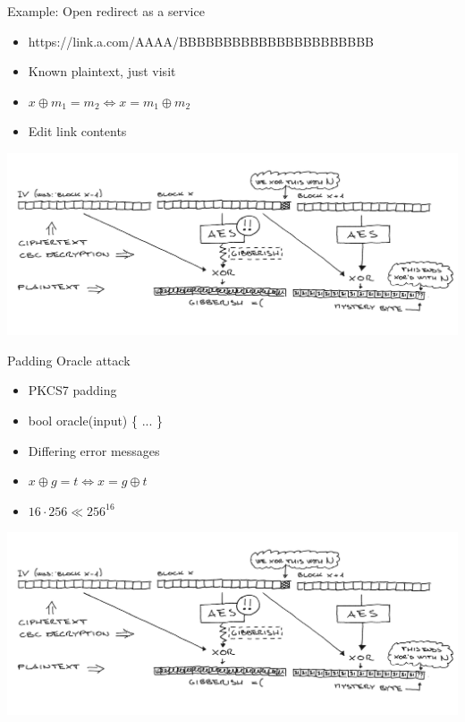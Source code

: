 \documentclass[10pt, compress]{beamer}
\begin{document}
\begin{frame}{Example: Open redirect as a service}
      \begin{itemize}
        \item https://link.a.com/AAAA/BBBBBBBBBBBBBBBBBBBBBB
        \item Known plaintext, just visit
        \item \( x \oplus m_1 = m_2 \Leftrightarrow x = m_1 \oplus m_2 \)
        \item Edit link contents
      \end{itemize}
      \includegraphics[width=\textwidth]{images/S22C-6e16050401360-1-1.jpg} \\
\end{frame}


\begin{frame}{Padding Oracle attack}
      \begin{itemize}
        \item PKCS7 padding
        \item bool oracle(input) \{ ... \} 
        \item Differing error messages
        \item \( x \oplus g = t \Leftrightarrow x = g \oplus t \)
        \item \( 16 \cdot 256 \ll 256^{16} \)
      \end{itemize}
    \includegraphics[width=\textwidth]{images/S22C-6e16050401360-1-1.jpg} \\
\end{frame}
\end{document}
